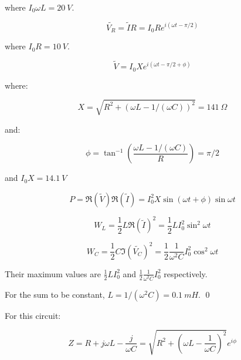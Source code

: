 \documentclass[12pt]{article}
\begin{document}
where $I_{0} \omega L = \qty{20}{V}$.

\begin{equation}
    \tilde{V_{R}} = \tilde{I} R = I_{0} R e^{i(\omega t - \pi/2)}
\end{equation}

where $I_{0} R = \qty{10}{V}$.

\begin{equation}
    \tilde{V} = I_{0} X e^{i(\omega t - \pi/2 + \phi)}
\end{equation}

where:

\begin{equation}
    X = \sqrt{R^{2} + (\omega L - 1/(\omega C))^{2}} = \qty{141}{\Omega}
\end{equation}

and:

\begin{equation}
    \phi = \tan^{-1}{\left( \frac{\omega L - 1/(\omega C)}{R} \right)} = \pi/2
\end{equation}

and $I_{0} X = \qty{14.1}{V}$


\begin{equation}
    P = \Re(\tilde{V}) \Re(\tilde{I}) = I_{0}^{2} X \sin{(\omega t + \phi)} \sin{\omega t}
\end{equation}


\begin{equation}
    W_{L} = \frac{1}{2} L \Re(\tilde{I})^{2} = \frac{1}{2} L I_{0}^{2} \sin^{2}{\omega t}
\end{equation}

\begin{equation}
    W_{C} = \frac{1}{2} C \Im(\tilde{V_{C}})^{2} = \frac{1}{2} \frac{1}{\omega^{2}C} I_{0}^{2} \cos^{2}{\omega t}
\end{equation}


Their maximum values are $\frac{1}{2} L I_{0}^{2}$ and $\frac{1}{2} \frac{1}{\omega^{2}C} I_{0}^{2}$ respectively.


For the sum to be constant, $L = 1/(\omega^{2} C) = \qty{0.1}{mH}$.
\qed


For this circuit:

\begin{equation}
    Z = R + j \omega L - \frac{j}{\omega C} = \sqrt{R^{2} + (\omega L - \frac{1}{\omega C})^{2}} e^{i\phi}
\end{equation}
\end{document}
